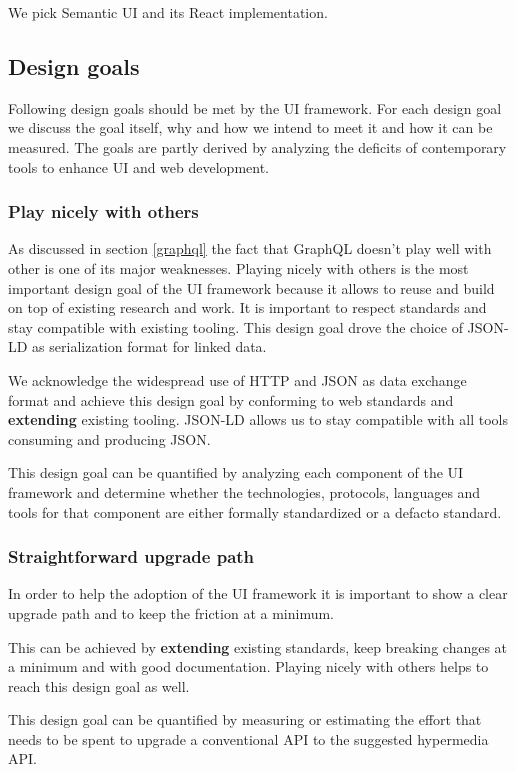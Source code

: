 We pick Semantic UI and its React implementation.

\subsection{Design goals}\label{sec:designgoals}
Following design goals should be met by the UI framework. For each design goal we discuss the goal itself, why and how we intend to meet it and how it can be measured.
The goals are partly derived by analyzing the deficits of contemporary tools to enhance UI and web development.

\subsubsection{Play nicely with others}\label{sec:playnice}
As discussed in section \ref{graphql} the fact that GraphQL doesn't play well with other is one of its major weaknesses. Playing nicely with others is the most important design goal of the UI framework because it allows to reuse and build on top of existing research and work.
It is important to respect standards and stay compatible with existing tooling. This design goal drove the choice of JSON-LD as serialization format for linked data.

We acknowledge the widespread use of HTTP and JSON as data exchange format and achieve this design goal by conforming to web standards and \textbf{extending} existing tooling. JSON-LD allows us to stay compatible with all tools consuming and producing JSON.

This design goal can be quantified by analyzing each component of the UI framework and determine whether the technologies, protocols, languages and tools for that component are either formally standardized or a defacto standard.

\subsubsection{Straightforward upgrade path}
In order to help the adoption of the UI framework it is important to show a clear upgrade path and to keep the friction at a minimum.

This can be achieved by \textbf{extending} existing standards, keep breaking changes at a minimum and with good documentation. Playing nicely with others helps to reach this design goal as well.

This design goal can be quantified by measuring or estimating the effort that needs to be spent to upgrade a conventional API to the suggested hypermedia API.

